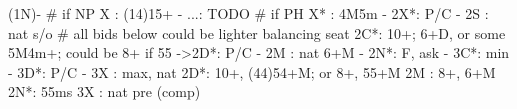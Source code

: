 (1N)-
# if NP
X  : (14)15+
   - ...: TODO
# if PH
X* : 4M5m
   - 2X*: P/C
   - 2S : nat s/o
# all bids below could be lighter balancing seat
2C*: 10+; 6+D, or some 5M4m+; could be 8+ if 55
   ->2D*: P/C
   - 2M : nat 6+M
   - 2N*: F, ask
		- 3C*: min
			 - 3D*: P/C
		- 3X : max, nat
2D*: 10+, (44)54+M; or 8+, 55+M
2M : 8+, 6+M
2N*: 55ms
3X : nat pre (comp)
